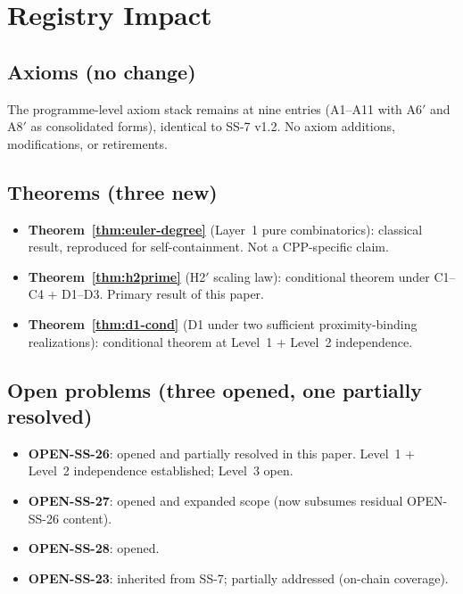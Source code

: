 \documentclass[11pt,letterpaper]{article}
\theoremstyle{definition}
\begin{document}

\section{Registry Impact}
\label{sec:registry-impact}

\subsection{Axioms (no change)}
The programme-level axiom stack remains at nine entries (A1--A11 with A6$'$ and A8$'$ as consolidated forms), identical to SS-7 v1.2. No axiom additions, modifications, or retirements.

\subsection{Theorems (three new)}
\begin{itemize}
  \item \textbf{Theorem~\ref{thm:euler-degree}} (Layer~1 pure combinatorics): classical result, reproduced for self-containment. Not a CPP-specific claim.
  \item \textbf{Theorem~\ref{thm:h2prime}} (H2$'$ scaling law): conditional theorem under C1--C4 + D1--D3. Primary result of this paper.
  \item \textbf{Theorem~\ref{thm:d1-cond}} (D1 under two sufficient proximity-binding realizations): conditional theorem at Level~1 + Level~2 independence.
\end{itemize}

\subsection{Open problems (three opened, one partially resolved)}
\begin{itemize}
  \item \textbf{OPEN-SS-26}: opened and partially resolved in this paper. Level~1 + Level~2 independence established; Level~3 open.
  \item \textbf{OPEN-SS-27}: opened and expanded scope (now subsumes residual OPEN-SS-26 content).
  \item \textbf{OPEN-SS-28}: opened.
  \item \textbf{OPEN-SS-23}: inherited from SS-7; partially addressed (on-chain coverage).
\end{itemize}
\end{document}
